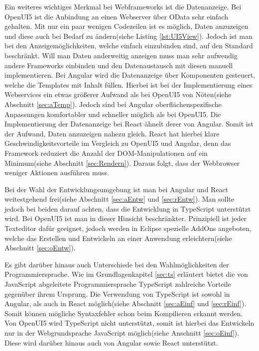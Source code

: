 Ein weiteres wichtiges Merkmal bei Webframeworks ist die Datenanzeige. Bei OpenUI5 ist die Anbindung an einen Webserver über OData sehr einfach gehalten. Mit nur ein paar wenigen Codezeilen ist es möglich, Daten anzuzeigen und diese auch bei Bedarf zu ändern(siehe Listing \ref{lst:UI5View}). Jedoch ist man bei den Anzeigemöglichkeiten, welche einfach einzubinden sind, auf den Standard beschränkt. Will man Daten anderweitig anzeigen muss man sehr aufwendig andere Frameworks einbinden und den Datenaustausch mit diesen manuell implementieren. Bei Angular wird die Datenanzeige über Komponenten gesteuert, welche die Templates mit Inhalt füllen. Hierbei ist bei der Implementierung eines Webservices ein etwas größerer Aufwand als bei OpenUI5 von Nöten(siehe Abschnitt \ref{sec:aTemp}). Jedoch sind bei Angular oberflächenspezifische Anpassungen komfortabler und schneller möglich als bei OpenUI5. Die Implementierung der Datenanzeige bei React ähnelt derer von Angular. Somit ist der Aufwand, Daten anzuzeigen nahezu gleich. React hat hierbei klare Geschwindigkeitsvorteile im Vergleich zu OpenUI5 und Angular, denn das Framework reduziert die Anzahl der DOM-Manipulationen auf ein Minimum(siehe Abschnitt \ref{sec:Rendern}). Daraus folgt, dass der Webbrowser weniger Aktionen ausführen muss.

Bei der Wahl der Entwicklungsumgebung ist man bei Angular und React weitestgehend frei(siehe Abschnitt \ref{sec:aEntw} und \ref{sec:rEntw}). Man sollte jedoch bei beiden darauf achten, dass die Entwicklung in TypeScript unterstützt wird. Bei OpenUI5 ist man in dieser Hinsicht beschränkter. Prinzipiell ist jeder Texteditor dafür geeignet, jedoch werden in Eclipse spezielle AddOns angeboten, welche das Erstellen und Entwickeln an einer Anwendung erleichtern(siehe Abschnitt \ref{sec:oEntw}).

Es gibt darüber hinaus auch Unterschiede bei den Wahlmöglichkeiten der Programmiersprache. Wie im Grundlagenkapitel \ref{sec:ts} erläutert bietet die von JavaScript abgeleitete Programmiersprache TypeScript zahlreiche Vorteile gegenüber ihrem Ursprung. Die Verwendung von TypeScript ist sowohl in Angular, als auch in React möglich(siehe Abschnitt \ref{sec:aEinf} und \ref{sec:rEinf}). Somit können mögliche Syntaxfehler schon beim Kompilieren erkannt werden. Von OpenUI5 wird TypeScript nicht unterstützt, somit ist hierbei das Entwickeln nur in der Webgrundsprache JavaScript möglich(siehe Anschnitt \ref{sec:oEinf}). Diese wird darüber hinaus auch von Angular sowie React unterstützt.




